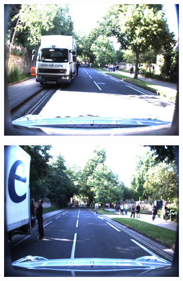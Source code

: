 \documentclass[10pt, aspectratio=169]{beamer}
\begin{document}
\begin{frame}{}
       \begin{figure}
        \centering
        \begin{subfigure}{0.46\textwidth}
            \includegraphics[width=\textwidth]{contents/images/ex1/00153.jpg}
        \end{subfigure}
        \hfill
        \hfill
        \begin{subfigure}{0.46\textwidth}
            \includegraphics[width=\textwidth]{contents/images/ex1/00192.jpg}
        \end{subfigure}
    \end{figure}
\end{frame}
\end{document}
